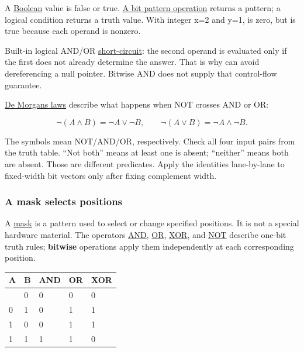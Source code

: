 \hypertarget{01-foundations-i-ch001-boolean-reasoning-and-control-flow}{}

A \hyperref[appendix-24475e1596a8]{Boolean} value is false or true. \hyperref[appendix-fe6b457d68d8]{A bit pattern operation} returns a pattern; a logical condition returns a truth value. With integer x=2 and y=1,  is zero, but  is true because each operand is nonzero.

Built-in logical AND/OR \hyperref[appendix-2e245a6fa8d3]{short-circuit}: the second operand is evaluated only if the first does not already determine the answer. That is why  can avoid dereferencing a null pointer. Bitwise AND does not supply that control-flow guarantee.

\hyperref[appendix-9079d3659da4]{De Morgan\textquotesingle s laws} describe what happens when NOT crosses AND or OR:

\[
\neg(A\land B)=\neg A\lor\neg B,\qquad
\neg(A\lor B)=\neg A\land\neg B.
\]

The symbols mean NOT/AND/OR, respectively. Check all four input pairs from the truth table. ``Not both'' means at least one is absent; ``neither'' means both are absent. Those are different predicates. Apply the identities lane-by-lane to fixed-width bit vectors only after fixing complement width.

\subsubsection{A mask selects positions}\label{01-foundations-i-ch001-a-mask-selects-positions}

\hypertarget{01-foundations-i-ch001-a-mask-selects-positions}{}

A \hyperref[appendix-dbe5905163c2]{mask} is a pattern used to select or change specified positions. It is not a special hardware material. The operators \hyperref[appendix-68b52453737c]{AND}, \hyperref[appendix-a427ce8ce8a6]{OR}, \hyperref[appendix-d49161831368]{XOR}, and \hyperref[appendix-8f38927cfc54]{NOT} describe one-bit truth rules; \textbf{bitwise} operations apply them independently at each corresponding position.

{\def\LTcaptype{none} %
\begin{longtable}[]{@{}lllll@{}}
\toprule\noalign{}
A & B & AND & OR & XOR \\
\midrule\noalign{}
\endhead
\bottomrule\noalign{}
\endlastfoot
0 & 0 & 0 & 0 & 0 \\
0 & 1 & 0 & 1 & 1 \\
1 & 0 & 0 & 1 & 1 \\
1 & 1 & 1 & 1 & 0 \\
\end{longtable}
}


